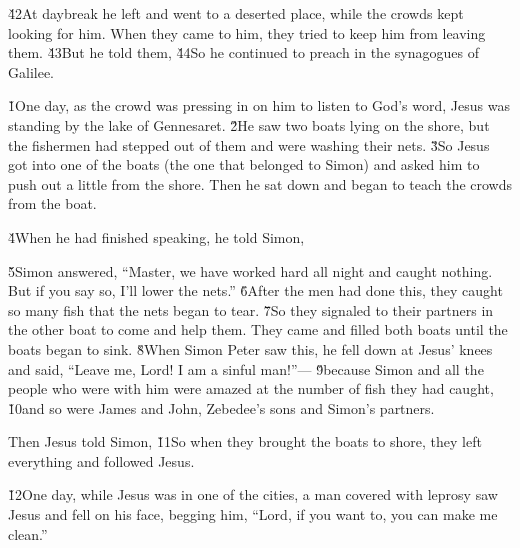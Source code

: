 \v{42}At daybreak he left and went to a deserted place, while the crowds kept looking for him. When they came to him, they tried to keep him from leaving them. \v{43}But he told them,  \v{44}So he continued to preach in the synagogues of Galilee.

\v{1}One day, as the crowd was pressing in on him to listen to God's word, Jesus was standing by the lake of Gennesaret. \v{2}He saw two boats lying on the shore, but the fishermen had stepped out of them and were washing their nets. \v{3}So Jesus got into one of the boats (the one that belonged to Simon) and asked him to push out a little from the shore. Then he sat down and began to teach the crowds from the boat.

\v{4}When he had finished speaking, he told Simon, 

\v{5}Simon answered, ``Master, we have worked hard all night and caught nothing. But if you say so, I'll lower the nets.'' \v{6}After the men had done this, they caught so many fish that the nets began to tear. \v{7}So they signaled to their partners in the other boat to come and help them. They came and filled both boats until the boats began to sink. \v{8}When Simon Peter saw this, he fell down at Jesus' knees and said, ``Leave me, Lord! I am a sinful man!''--- \v{9}because Simon and all the people who were with him were amazed at the number of fish they had caught, \v{10}and so were James and John, Zebedee's sons and Simon's partners.

Then Jesus told Simon,  \v{11}So when they brought the boats to shore, they left everything and followed Jesus.

\v{12}One day, while Jesus was in one of the cities, a man covered with leprosy saw Jesus and fell on his face, begging him, ``Lord, if you want to, you can make me clean.''


